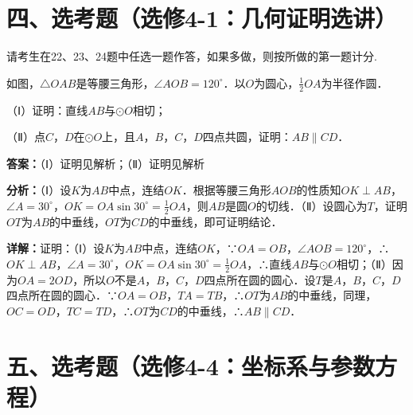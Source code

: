 \section*{四、选考题（选修4-1：几何证明选讲）}
请考生在22、23、24题中任选一题作答，如果多做，则按所做的第一题计分.

\begin{question}[points=10]
如图，$\triangle OAB$是等腰三角形，$\angle AOB=120^\circ$．以$O$为圆心，$\frac{1}{2}OA$为半径作圆．

（Ⅰ）证明：直线$AB$与$\odot O$相切；

（Ⅱ）点$C$，$D$在$\odot O$上，且$A$，$B$，$C$，$D$四点共圆，证明：$AB\parallel CD$．
\begin{solution}
\textbf{答案：}（Ⅰ）证明见解析；（Ⅱ）证明见解析

\textbf{分析：}（Ⅰ）设$K$为$AB$中点，连结$OK$．根据等腰三角形$AOB$的性质知$OK\perp AB$，$\angle A=30^\circ$，$OK=OA\sin30^\circ=\frac{1}{2}OA$，则$AB$是圆$O$的切线．（Ⅱ）设圆心为$T$，证明$OT$为$AB$的中垂线，$OT$为$CD$的中垂线，即可证明结论．

\textbf{详解：}证明：（Ⅰ）设$K$为$AB$中点，连结$OK$，∵$OA=OB$，$\angle AOB=120^\circ$，∴$OK\perp AB$，$\angle A=30^\circ$，$OK=OA\sin30^\circ=\frac{1}{2}OA$，∴直线$AB$与$\odot O$相切；（Ⅱ）因为$OA=2OD$，所以$O$不是$A$，$B$，$C$，$D$四点所在圆的圆心．设$T$是$A$，$B$，$C$，$D$四点所在圆的圆心．∵$OA=OB$，$TA=TB$，∴$OT$为$AB$的中垂线，同理，$OC=OD$，$TC=TD$，∴$OT$为$CD$的中垂线，∴$AB\parallel CD$．
\end{solution}
\end{question}

\section*{五、选考题（选修4-4：坐标系与参数方程）}


